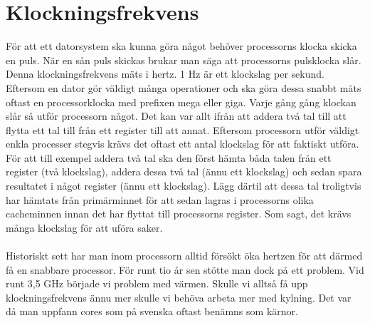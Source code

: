 \documentclass[12pt, letterpaper]{report}
\begin{document}
\section{Klockningsfrekvens}
För att ett datorsystem ska kunna göra något behöver processorns klocka skicka en puls. 
När en sån puls skickas brukar man säga att processorns pulsklocka slår. Denna klockningsfrekvens mäts i hertz. 1 Hz är ett klockslag per sekund. Eftersom en dator gör väldigt många operationer och ska göra dessa snabbt mäts oftast en processorklocka med prefixen mega eller giga. Varje gång gång klockan slår så utför processorn något. Det kan var allt ifrån att addera två tal till att flytta ett tal till från ett register till att annat. Eftersom processorn utför väldigt enkla processer stegvis krävs det oftast ett antal klockslag för att faktiskt utföra. För att till exempel addera två tal ska den först hämta båda talen från ett register (två klockslag), addera dessa två tal (ännu ett klockslag) och sedan spara resultatet i något register (ännu ett klockslag). Lägg därtil att dessa tal troligtvis har hämtats från primärminnet för att sedan lagras i processorns olika cacheminnen innan det har flyttat till processorns register. Som sagt, det krävs många klockslag för att uföra saker.\\\\
Historiskt sett har man inom processorn alltid försökt öka hertzen för att därmed få en snabbare processor. För runt tio år sen stötte man dock på ett problem. Vid runt 3,5 GHz började vi problem med värmen. Skulle vi alltså få upp klockningsfrekvens ännu mer skulle vi behöva arbeta mer med kylning. Det var då man uppfann cores som på svenska oftast benämns som kärnor.
\end{document}
